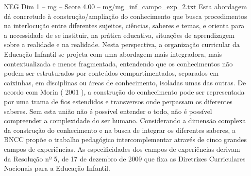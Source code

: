 \begin{textsample}{NEG Dim 1 – mg – Score 4.00 – mg/mg\_inf\_campo\_exp\_2.txt}  \label{ex:f1_neg_056}
Esta abordagem dá concretude à construção/ampliação do conhecimento que busca procedimentos na interlocução entre diferentes sujeitos, ciências, saberes e temas, e orienta para a necessidade de se instituir, na prática educativa, situações de aprendizagem sobre a realidade e na realidade.
Nesta perspectiva, a organização curricular da Educação Infantil se projeta com uma abordagem mais integradora, mais contextualizada e menos fragmentada, entendendo que os conhecimentos não podem ser estruturados por conteúdos compartimentados, separados em caixinhas, em disciplinas ou áreas de conhecimento, isoladas umas das outras.
De acordo com Morin ( 2001 ), a construção do conhecimento pode ser representada por uma trama de fios estendidos e transversos onde perpassam os diferentes saberes.
Sem esta união não é possível entender o todo, não é possível compreender a complexidade do ser humano.
Considerando a dimensão complexa da construção do conhecimento e na busca de integrar os diferentes saberes, a BNCC propõe o trabalho pedagógico intercomplementar através de cinco grandes campos de experiências.
As especificidades dos campos de experiências derivam da Resolução nº 5, de 17 de dezembro de 2009 que fixa as Diretrizes Curriculares Nacionais para a Educação Infantil.

\end{textsample}
